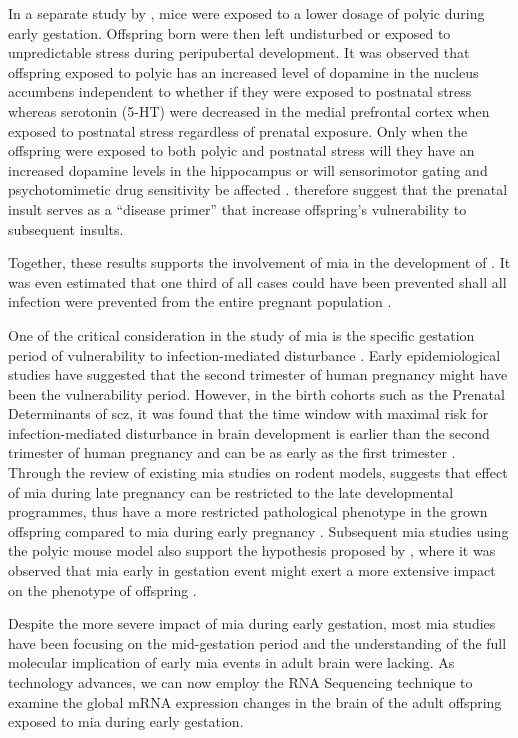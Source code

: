 	In a separate study by \citet{Giovanoli2013}, mice were exposed to a lower dosage of \gls{polyic} during early gestation.
	Offspring born were then left undisturbed or exposed to unpredictable stress during peripubertal development.
	It was observed that offspring exposed to \gls{polyic} has an increased level of dopamine in the nucleus accumbens independent to whether if they were exposed to postnatal stress whereas serotonin (5-HT) were decreased in the medial prefrontal cortex when exposed to postnatal stress regardless of prenatal exposure.
	Only when the offspring were exposed to both \gls{polyic} and postnatal stress will they have an increased dopamine levels in the hippocampus or will sensorimotor gating and psychotomimetic drug sensitivity be affected \citep{Giovanoli2013}.
	\citet{Giovanoli2013} therefore suggest that the prenatal insult serves as a ``disease primer'' that increase offspring's vulnerability to subsequent insults.
	
	Together, these results supports the involvement of \gls{mia} in the development of .
	It was even estimated that one third of all  cases could have been prevented shall all infection were prevented from the entire pregnant population \citep{Brown2010}.
	
	One of the critical consideration in the study of \gls{mia} is the specific gestation period of vulnerability to infection-mediated disturbance \citep{Meyer2007a}.
	Early epidemiological studies have suggested that the second trimester of human pregnancy might have been the vulnerability period.
	However, in the birth cohorts such as the Prenatal Determinants of \Gls{scz}, it was found that the time window with maximal risk for infection-mediated disturbance in brain development is earlier than the second trimester of human pregnancy and can be as early as the first trimester \citep{Meyer2007a}.
	Through the review of existing \gls{mia} studies on rodent models, \citet{Meyer2007a} suggests that effect of \gls{mia} during late pregnancy can be restricted to the late developmental programmes, thus have a more restricted pathological phenotype in the grown offspring compared to \gls{mia} during early pregnancy \citep{Meyer2007a}.
	Subsequent \gls{mia} studies using the \gls{polyic} mouse model also support the hypothesis proposed by \citet{Meyer2007a}, where it was observed that \gls{mia} early in gestation event might exert a more extensive impact on the phenotype of offspring \citep{Li2009c,Li2010a}.

	Despite the more severe impact of \gls{mia} during early gestation, most \gls{mia} studies have been focusing on the mid-gestation period and the understanding of the full molecular implication of early \gls{mia} events in adult brain were lacking.
	As technology advances, we can now employ the RNA Sequencing technique to examine the global mRNA expression changes in the brain of the adult offspring exposed to \gls{mia} during early gestation.
	
